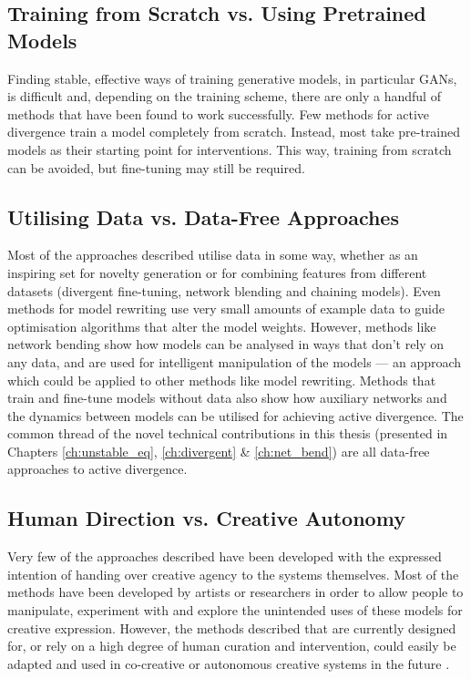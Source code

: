 \subsection{Training from Scratch vs. Using Pretrained Models}

Finding stable, effective ways of training generative models, in particular GANs, is difficult and, depending on the training scheme, there are only a handful of methods that have been found to work successfully. Few methods for active divergence train a model completely from scratch. Instead, most take pre-trained models as their starting point for interventions. This way, training from scratch can be avoided, but fine-tuning may still be required. 


\subsection{Utilising Data vs. Data-Free Approaches}
\label{c6:subsec:datafree}

Most of the approaches described utilise data in some way, whether as an inspiring set for novelty generation or for combining features from different datasets (divergent fine-tuning, network blending and chaining models). 
Even methods for model rewriting use very small amounts of example data to guide optimisation algorithms that alter the model weights. 
However, methods like network bending show how models can be analysed in ways that don't rely on any data, and are used for intelligent manipulation of the models --- an approach which could be applied to other methods like model rewriting. 
Methods that train and fine-tune models without data also show how auxiliary networks and the dynamics between models can be utilised for achieving active divergence.
The common thread of the novel technical contributions in this thesis (presented in Chapters \ref{ch:unstable_eq}, \ref{ch:divergent} \& \ref{ch:net_bend}) are all data-free approaches to active divergence.

\subsection{Human Direction vs. Creative Autonomy}
Very few of the approaches described have been developed with the expressed intention of handing over creative agency to the systems themselves. Most of the methods have been developed by artists or researchers in order to allow people to manipulate, experiment with and explore the unintended uses of these models for creative expression. However, the methods described that are currently designed for, or rely on a high degree of human curation and intervention, could easily be adapted and used in co-creative or autonomous creative systems in the future \citep{berns2021automating}.

